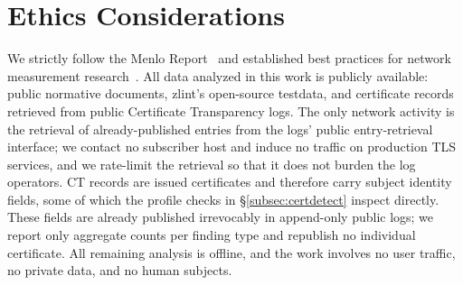 \section*{Ethics Considerations}

We strictly follow the Menlo Report~\cite{kenneally2012menlo} and established best
practices for network measurement research~\cite{partridge2016ethical,allman2007issues}.
All data analyzed in this work is publicly available: public normative documents,
zlint's open-source testdata, and certificate records retrieved from public
Certificate Transparency logs. The only network activity is the retrieval of
already-published entries from the logs' public entry-retrieval interface; we
contact no subscriber host and induce no traffic on production TLS services, and we
rate-limit the retrieval so that it does not burden the log operators. CT records are
issued certificates and therefore carry subject identity fields, some of which the
profile checks in \S\ref{subsec:certdetect} inspect directly. These fields are
already published irrevocably in append-only public logs; we report only aggregate
counts per finding type and republish no individual certificate. All remaining
analysis is offline, and the work involves no user traffic, no private data, and no
human subjects.
